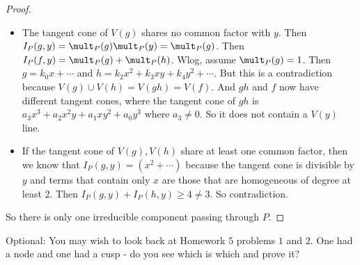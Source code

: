 \documentclass{article}
\begin{document}
\begin{itemize}
\begin{proof}
\begin{itemize}
                        \item The tangent cone of $V(g)$ shares no common factor with $y$. Then $I_{P}(g, y) = \mult_{P}(g)\mult_{P}(y) = \mult_{P}(g)$. Then $I_{P}(f, y) = \mult_{P}(g)  + \mult_{P}(h)$. Wlog, assume $\mult_{P}(g) = 1$. Then $g = k_{0}x + \cdots$ and $h = k_{2}x^{2} + k_{3}xy + k_{4}y^{2} + \cdots$. But this is a contradiction because $V(g) \cup V(h) = V(gh) = V(f)$. And $gh$ and $f$ now have different tangent cones, where the tangent cone of $gh$ is $a_{3}x^{3} + a_{2}x^{2}y + a_{1}xy^{2} + a_{0}y^{3}$ where $a_{3} \neq 0$. So it does not contain a $V(y)$ line.

                        \item If the tangent cone of $V(g), V(h)$ share at least one common factor, then we know that $I_{P}(g, y) = (x^{2} + \cdots)$ because the tangent cone is divisible by $y$ and terms that contain only $x$ are those that are homogeneous of degree at least $2$. Then $I_{P}(g, y) + I_{P}(h, y) \geq4 \neq 3$. So contradiction.
                    \end{itemize}
                So there is only one irreducible component passing through $P$.
            \end{proof}
    \end{itemize}

Optional: You may wish to look back at Homework $5$ problems $1$ and $2$. One had a node and one had a cusp - do you see which is which and prove it?
\end{document}

